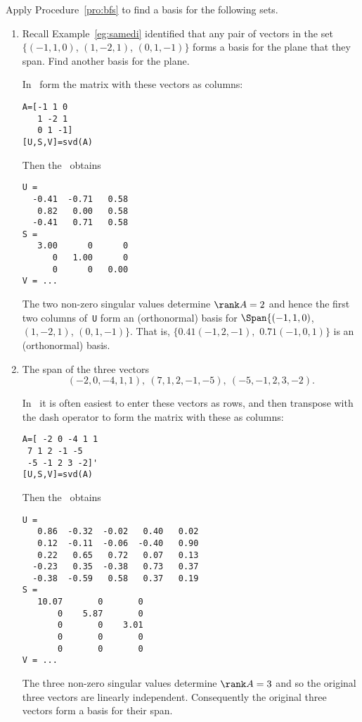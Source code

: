 \begin{example} \label{eg:}
Apply Procedure~\ref{pro:bfs} to find a basis for the following sets.
\begin{enumerate}
\item Recall Example~\ref{eg:samedi} identified that any pair of vectors in the set \(\{(-1,1,0)\), \((1,-2,1)\), \((0,1,-1)\}\) forms a basis for the plane that they span.  
Find another basis for the plane.
\begin{solution} 
In \script\ form the matrix with these vectors as columns:
\begin{verbatim}
A=[-1 1 0
   1 -2 1
   0 1 -1]
[U,S,V]=svd(A)
\end{verbatim}
\setbox\ajrqrbox\hbox{}%
\marginpar{\usebox{\ajrqrbox}}%
Then the \svd\  obtains \twodp
\begin{verbatim}
U =
  -0.41  -0.71   0.58
   0.82   0.00   0.58
  -0.41   0.71   0.58
S =
   3.00      0      0
      0   1.00      0
      0      0   0.00
V = ...
\end{verbatim}
The two non-zero singular values determine \(\rank A=2\) and hence the first two columns of~\verb|U| form an (orthonormal) basis for \(\Span\{(-1,1,0)\), \((1,-2,1)\), \((0,1,-1)\}\).
That is, \(\{0.41(-1,2,-1),\) \(0.71(-1,0,1)\}\) is an (orthonormal) basis.
\end{solution}

\item The span of the three vectors
\begin{equation*}
(-2,0,-4,1,1),\ 
(7,1,2,-1,-5),\ 
(-5,-1,2,3,-2).
\end{equation*}
\begin{solution} 
In \script\ it is often easiest to enter these vectors as rows, and then transpose with the dash operator to form the matrix with these as columns:
\begin{verbatim}
A=[ -2 0 -4 1 1
 7 1 2 -1 -5
 -5 -1 2 3 -2]'
[U,S,V]=svd(A)
\end{verbatim}
\setbox\ajrqrbox\hbox{}%
\marginpar{\usebox{\ajrqrbox}}%
Then the \svd\ obtains \twodp
\begin{verbatim}
U =
   0.86  -0.32  -0.02   0.40   0.02
   0.12  -0.11  -0.06  -0.40   0.90
   0.22   0.65   0.72   0.07   0.13
  -0.23   0.35  -0.38   0.73   0.37
  -0.38  -0.59   0.58   0.37   0.19
S =
   10.07       0       0
       0    5.87       0
       0       0    3.01
       0       0       0
       0       0       0
V = ...
\end{verbatim}
The three non-zero singular values determine  \(\rank A=3\) and so the original three vectors are linearly independent.
Consequently the original three vectors form a basis for their span.


\end{solution}
\end{enumerate}
\end{example}
